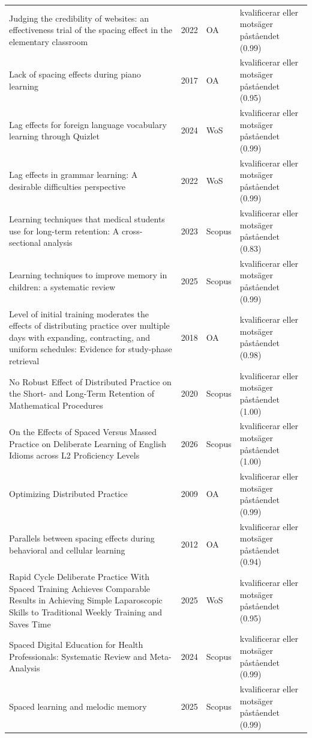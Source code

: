 \begin{longtable}{@{}%
  >{\raggedright\arraybackslash}p{}c%
  >{\raggedright\arraybackslash}p{}%
  >{\raggedright\arraybackslash}p{}@{}}
Judging the credibility of websites: an effectiveness trial of the spacing effect in the elementary classroom & 2022 & OA & kvalificerar eller motsäger påståendet (0.99) \\
Lack of spacing effects during piano learning & 2017 & OA & kvalificerar eller motsäger påståendet (0.95) \\
Lag effects for foreign language vocabulary learning through Quizlet & 2024 & WoS & kvalificerar eller motsäger påståendet (0.99) \\
Lag effects in grammar learning: A desirable difficulties perspective & 2022 & WoS & kvalificerar eller motsäger påståendet (0.99) \\
Learning techniques that medical students use for long-term retention: A cross-sectional analysis & 2023 & Scopus & kvalificerar eller motsäger påståendet (0.83) \\
Learning techniques to improve memory in children: a systematic review & 2025 & Scopus & kvalificerar eller motsäger påståendet (0.99) \\
Level of initial training moderates the effects of distributing practice over multiple days with expanding, contracting, and uniform schedules: Evidence for study-phase retrieval & 2018 & OA & kvalificerar eller motsäger påståendet (0.98) \\
No Robust Effect of Distributed Practice on the Short- and Long-Term Retention of Mathematical Procedures & 2020 & Scopus & kvalificerar eller motsäger påståendet (1.00) \\
On the Effects of Spaced Versus Massed Practice on Deliberate Learning of English Idioms across L2 Proficiency Levels & 2026 & Scopus & kvalificerar eller motsäger påståendet (1.00) \\
Optimizing Distributed Practice & 2009 & OA & kvalificerar eller motsäger påståendet (0.99) \\
Parallels between spacing effects during behavioral and cellular learning & 2012 & OA & kvalificerar eller motsäger påståendet (0.94) \\
Rapid Cycle Deliberate Practice With Spaced Training Achieves Comparable Results in Achieving Simple Laparoscopic Skills to Traditional Weekly Training and Saves Time & 2025 & WoS & kvalificerar eller motsäger påståendet (0.95) \\
Spaced Digital Education for Health Professionals: Systematic Review and Meta-Analysis & 2024 & Scopus & kvalificerar eller motsäger påståendet (0.99) \\
Spaced learning and melodic memory & 2025 & Scopus & kvalificerar eller motsäger påståendet (0.99) \\

\end{longtable}
